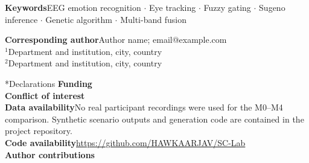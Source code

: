 \documentclass[10pt,twoside]{article}
\makeatletter
\renewcommand{\section}{\@startsection{section}{1}{0pt}{1.9ex plus .4ex}{.8ex}{\large\bfseries}}
\makeatother
\begin{document}
\vspace{2mm}
\noindent\textbf{Keywords}\quad EEG emotion recognition \(\cdot\) Eye tracking \(\cdot\) Fuzzy gating \(\cdot\) Sugeno inference \(\cdot\) Genetic algorithm \(\cdot\) Multi-band fusion

\vspace{5mm}
\noindent\begin{minipage}{0.88\linewidth}
\small
\textbf{Corresponding author}\quad Author name; email@example.com\\
$^{1}$Department and institution, city, country\\
$^{2}$Department and institution, city, country
\end{minipage}

\vspace{5mm}
\noindent{}



\FloatBarrier
\section*{Declarations}
\noindent\textbf{Funding}\\
\textbf{Conflict of interest}\\
\textbf{Data availability}\quad No real participant recordings were used for the M0--M4 comparison. Synthetic scenario outputs and generation code are contained in the project repository.\\
\textbf{Code availability}\quad \url{https://github.com/HAWKAARJAV/SC-Lab}\\
\textbf{Author contributions}

\clearpage
\appendix


\end{document}
